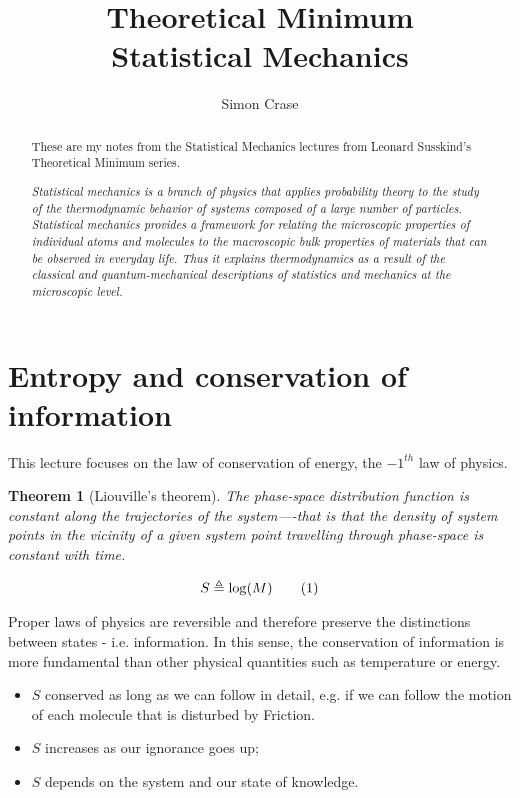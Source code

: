\documentclass[]{article}
\title{
	Theoretical Minimum\\
	Statistical Mechanics
}
\author{Simon Crase}
\newcommand\numberthis{\addtocounter{equation}{1}\tag{\theequation}}
\newtheorem{thm}{Theorem}
\begin{document}
\maketitle

\begin{abstract}
These are my notes from the Statistical Mechanics lectures from Leonard Susskind's Theoretical Minimum series.

\textit{Statistical mechanics is a branch of physics that applies probability theory to the study of the thermodynamic behavior of systems composed of a large number of particles. Statistical mechanics provides a framework for relating the microscopic properties of individual atoms and molecules to the macroscopic bulk properties of materials that can be observed in everyday life. Thus it explains thermodynamics as a result of the classical and quantum-mechanical descriptions of statistics and mechanics at the microscopic level.}
\end{abstract}

\tableofcontents

\listoffigures


\section{Entropy and conservation of information}


This lecture focuses on the law of conservation of energy, the $-1^{th}$ law of physics. 

\begin{thm}[Liouville's theorem]
	The phase-space distribution function is constant along the trajectories of the system—-that is that the density of system points in the vicinity of a given system point travelling through phase-space is constant with time.
\end{thm}

\begin{align*}
S \triangleq \log(M) \numberthis \label{eq:entropy:simple}
\end{align*}

Proper laws of physics are reversible and therefore preserve the distinctions between states - i.e. information.  In this sense, the conservation of information is more fundamental than other physical quantities such as temperature or energy.  
\begin{itemize}
	\item $S$ conserved as long as we can follow in detail, e.g. if we can follow the motion of each molecule that is disturbed by Friction.
	\item $S$ increases as our ignorance goes up;
	\item $S$ depends on the system and our state of knowledge.
\end{itemize}
\end{document}
